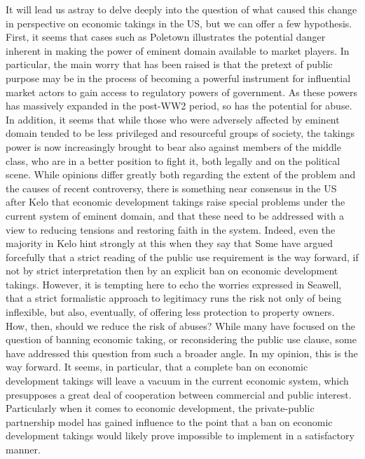 It will lead us astray to delve deeply into the question of what caused this change in perspective on economic takings in the US, but we can offer a few hypothesis. First, it seems that cases such as Poletown illustrates the potential danger inherent in making the power of eminent domain available to market players. In particular, the main worry that has been raised is that the pretext of public purpose may be in the process of becoming a powerful instrument for influential market actors to gain access to regulatory powers of government. As these powers has massively expanded in the post-WW2 period, so has the potential for abuse. In addition, it seems that while those who were adversely affected by eminent domain tended to be less privileged and resourceful groups of society, the takings power is now increasingly brought to bear also against members of the middle class, who are in a better position to fight it, both legally and on the political scene.
While opinions differ greatly both regarding the extent of the problem and the causes of recent controversy, there is something near consensus in the US after Kelo that economic development takings raise special problems under the current system of eminent domain, and that these need to be addressed with a view to reducing tensions and restoring faith in the system. Indeed, even the majority in Kelo hint strongly at this when they say that  
Some have argued forcefully that a strict reading of the public use requirement is the way forward, if not by strict interpretation then by an explicit ban on economic development takings.  However, it is tempting here to echo the worries expressed in Seawell, that a strict formalistic approach to legitimacy runs the risk not only of being inflexible, but also, eventually, of offering less  protection to property owners. How, then, should we reduce the risk of abuses?
While many have focused on the question of banning economic taking, or reconsidering the public use clause, some have addressed this question from such a broader angle. In my opinion, this is the way forward. It seems, in particular, that a complete ban on economic development takings will leave a vacuum in the current economic system, which presupposes a great deal of cooperation between commercial and public interest. Particularly when it comes to economic development, the private-public partnership model has gained influence to the point that a ban on economic development takings would likely prove impossible to implement in a satisfactory manner. 
